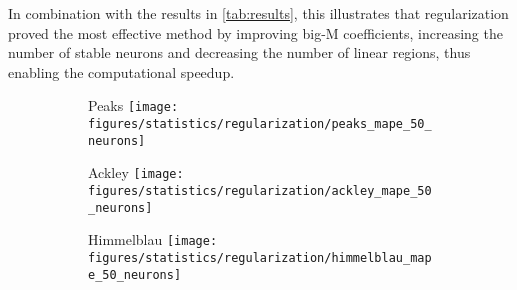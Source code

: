 In combination with the results in \vref{tab:results}, this illustrates that regularization proved the most effective method by improving big-M coefficients, increasing the number of stable neurons and decreasing the number of linear regions, thus enabling the computational speedup.
%
\begin{figure}[H]
    \centering
    \begin{subfigure}{.32\linewidth}
        \centering
        Peaks
        \texttt{[image: figures/statistics/regularization/peaks\_mape\_50\_neurons]}
    \end{subfigure}
    \begin{subfigure}{.32\linewidth}
        \centering
        Ackley
        \texttt{[image: figures/statistics/regularization/ackley\_mape\_50\_neurons]}
    \end{subfigure}
    \begin{subfigure}{.32\linewidth}
        \centering
        Himmelblau
        \texttt{[image: figures/statistics/regularization/himmelblau\_mape\_50\_neurons]}
    \end{subfigure}
    


\end{figure}
